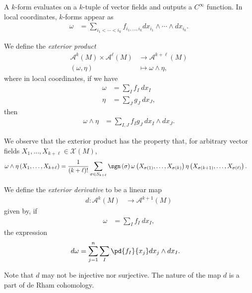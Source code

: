 \documentclass[10pt]{mypackage}
\begin{document}
A $k$-form evaluates on a $k$-tuple of vector fields and outputs a $C^{\infty}$ function. In local coordinates, $k$-forms appear as
\begin{align*}
  \omega &= \sum_{i_1 < \cdots < i_k} f_{i_1,\dots,i_k} dx_{i_1}\wedge\cdots\wedge dx_{i_k}.
\end{align*}
\begin{definition}
  We define the \textit{exterior product}
  \begin{align*}
    \mathcal{A}^{k}\left( M \right)\times \mathcal{A}^{\ell}\left( M \right) &\rightarrow \mathcal{A}^{k + \ell}\left( M \right)\\
    \left( \omega,\eta \right) &\mapsto \omega\wedge \eta,
  \end{align*}
  where in local coordinates, if we have
  \begin{align*}
    \omega &= \sum_{I}f_I\:dx_I\\
    \eta &= \sum_{J}g_J\:dx_J,
  \end{align*}
  then
  \begin{align*}
    \omega\wedge\eta &= \sum_{I,J}f_Ig_J\:dx_I\wedge dx_J.
  \end{align*}
\end{definition}
We observe that the exterior product has the property that, for arbitrary vector fields $X_1,\dots,X_{k + \ell}\in \mathcal{X}\left( M \right)$,
\begin{align*}
  \omega\wedge \eta\left( X_1,\dots,X_{k + \ell} \right) &= \frac{1}{\left( k+\ell \right)!} \sum_{\sigma\in S_{k + \ell}} \sgn\left( \sigma \right)\omega\left( X_{\sigma(1)},\dots,X_{\sigma(k)} \right) \eta\left( X_{\sigma(k+1)},\dots,X_{\sigma(\ell)} \right).
\end{align*}
\begin{definition}
  We define the \textit{exterior derivative} to be a linear map
  \begin{align*}
    d\colon \mathcal{A}^{k}\left( M \right)&\rightarrow \mathcal{A}^{k+1}\left( M \right)
  \end{align*}
  given by, if
  \begin{align*}
    \omega &= \sum_{I}f_I\:dx_I,
  \end{align*}
  the expression
  \begin{align*}
    d\omega &= \sum_{j=1}^{n}\sum_{I} \pd{f_I}{x_j}dx_j\wedge dx_I.
  \end{align*}
\end{definition}
\begin{remark}
  Note that $d$ may not be injective nor surjective. The nature of the map $d$ is a part of de Rham cohomology.
\end{remark}
\end{document}

